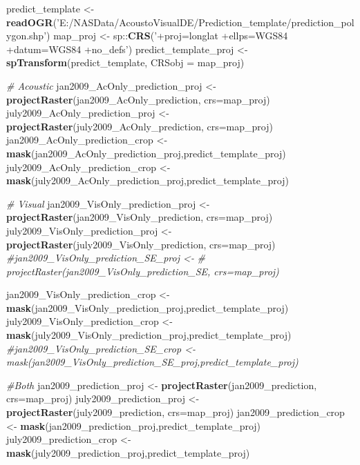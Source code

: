\documentclass[11pt,]{article}
\newenvironment{Shaded}{\begin{snugshade}}{\end{snugshade}}
\newcommand{\KeywordTok}[1]{\textcolor[rgb]{0.13,0.29,0.53}{\textbf{{#1}}}}
\newcommand{\DataTypeTok}[1]{\textcolor[rgb]{0.13,0.29,0.53}{{#1}}}
\newcommand{\StringTok}[1]{\textcolor[rgb]{0.31,0.60,0.02}{{#1}}}
\newcommand{\CommentTok}[1]{\textcolor[rgb]{0.56,0.35,0.01}{\textit{{#1}}}}
\newcommand{\NormalTok}[1]{{#1}}
\begin{document}
\begin{Shaded}
\begin{Highlighting}[]
\NormalTok{predict_template <-}\StringTok{ }\KeywordTok{readOGR}\NormalTok{(}\StringTok{'E:/NASData/AcoustoVisualDE/Prediction_template/prediction_polygon.shp'}\NormalTok{)}
\NormalTok{map_proj <-}\StringTok{ }\NormalTok{sp::}\KeywordTok{CRS}\NormalTok{(}\StringTok{'+proj=longlat +ellps=WGS84 +datum=WGS84 +no_defs'}\NormalTok{)}
\NormalTok{predict_template_proj <-}\StringTok{ }\KeywordTok{spTransform}\NormalTok{(predict_template, }\DataTypeTok{CRSobj =} \NormalTok{map_proj)}

\CommentTok{# Acoustic}
\NormalTok{jan2009_AcOnly_prediction_proj <-}\StringTok{ }\KeywordTok{projectRaster}\NormalTok{(jan2009_AcOnly_prediction, }\DataTypeTok{crs=}\NormalTok{map_proj)}
\NormalTok{july2009_AcOnly_prediction_proj <-}\StringTok{ }\KeywordTok{projectRaster}\NormalTok{(july2009_AcOnly_prediction, }\DataTypeTok{crs=}\NormalTok{map_proj)}
\NormalTok{jan2009_AcOnly_prediction_crop <-}\StringTok{ }\KeywordTok{mask}\NormalTok{(jan2009_AcOnly_prediction_proj,predict_template_proj)}
\NormalTok{july2009_AcOnly_prediction_crop <-}
\StringTok{  }\KeywordTok{mask}\NormalTok{(july2009_AcOnly_prediction_proj,predict_template_proj)}

\CommentTok{# Visual}
\NormalTok{jan2009_VisOnly_prediction_proj <-}\StringTok{ }
\StringTok{  }\KeywordTok{projectRaster}\NormalTok{(jan2009_VisOnly_prediction, }\DataTypeTok{crs=}\NormalTok{map_proj)}
\NormalTok{july2009_VisOnly_prediction_proj <-}\StringTok{ }
\StringTok{  }\KeywordTok{projectRaster}\NormalTok{(july2009_VisOnly_prediction, }\DataTypeTok{crs=}\NormalTok{map_proj)}
\CommentTok{#jan2009_VisOnly_prediction_SE_proj <- }
\CommentTok{#  projectRaster(jan2009_VisOnly_prediction_SE, crs=map_proj)}

\NormalTok{jan2009_VisOnly_prediction_crop <-}\StringTok{ }
\StringTok{  }\KeywordTok{mask}\NormalTok{(jan2009_VisOnly_prediction_proj,predict_template_proj)}
\NormalTok{july2009_VisOnly_prediction_crop <-}\StringTok{ }\KeywordTok{mask}\NormalTok{(july2009_VisOnly_prediction_proj,predict_template_proj)}
\CommentTok{#jan2009_VisOnly_prediction_SE_crop <- mask(jan2009_VisOnly_prediction_SE_proj,predict_template_proj)}

\CommentTok{#Both}
\NormalTok{jan2009_prediction_proj <-}\StringTok{ }\KeywordTok{projectRaster}\NormalTok{(jan2009_prediction, }\DataTypeTok{crs=}\NormalTok{map_proj)}
\NormalTok{july2009_prediction_proj <-}\StringTok{ }\KeywordTok{projectRaster}\NormalTok{(july2009_prediction, }\DataTypeTok{crs=}\NormalTok{map_proj)}
\NormalTok{jan2009_prediction_crop <-}\StringTok{ }\KeywordTok{mask}\NormalTok{(jan2009_prediction_proj,predict_template_proj)}
\NormalTok{july2009_prediction_crop <-}\StringTok{ }\KeywordTok{mask}\NormalTok{(july2009_prediction_proj,predict_template_proj)}
\end{Highlighting}
\end{Shaded}
\end{document}
